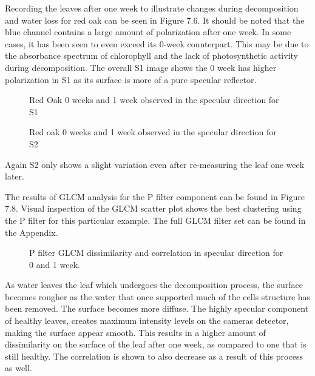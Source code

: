 Recording the leaves after one week to illustrate changes during decomposition and water loss for red oak can be seen in Figure 7.6.  It should be noted that the blue channel contains a large amount of polarization after one week. In some cases, it has been seen to even exceed its 0-week counterpart. This may be due to the absorbance spectrum of chlorophyll and the lack of photosynthetic activity during decomposition. The overall S1 image shows the 0 week has higher polarization in S1 as its surface is more of a pure specular reflector.
%
\begin{sidewaysfigure}
    \begin{center}
    \end{center}
    \caption{Red Oak 0 weeks and 1 week observed in the specular direction for S1}
    \label{fig:polarization}
\end{sidewaysfigure}
%
\begin{sidewaysfigure}
    \begin{center}
    \end{center}
    \caption{Red oak 0 weeks and 1 week observed in the specular direction for S2}
    \label{fig:polarization}
\end{sidewaysfigure}
%
Again S2 only shows a slight variation even after re-measuring the leaf one week later.

The results of GLCM analysis for the P filter component can be found in Figure 7.8.  Visual inspection of the GLCM scatter plot shows the best clustering using the P filter for this particular example.  The full GLCM filter set can be found in the Appendix.
%
\begin{figure}
    \begin{center}
    \end{center}
    \caption{P filter GLCM dissimilarity and correlation in specular direction for 0 and 1 week.}
    \label{fig:polarization}
\end{figure}
%
As water leaves the leaf which undergoes the decomposition process, the surface becomes rougher as the water that once supported much of the cells structure has been removed. The surface becomes more diffuse.  The highly specular component of healthy leaves, creates maximum intensity levels on the cameras detector, making the surface appear smooth.  This results in a higher amount of dissimilarity on the surface of the leaf after one week, as compared to one that is still healthy.  The correlation is shown to also decrease as a result of this process as well.

